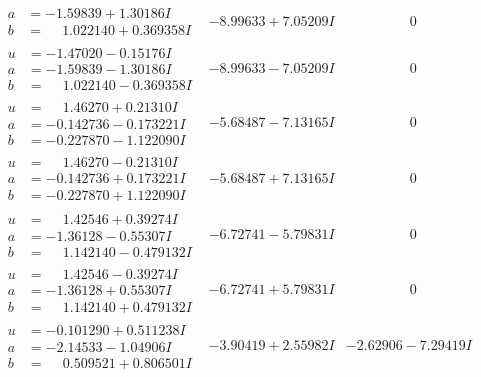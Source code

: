 \documentclass[1p]{elsarticle_modified}
\theoremstyle{definition}
\begin{document}
$$\begin{array}{c|c|c}
\begin{aligned}
a &= -1.59839 + 1.30186 I \\
b &= \phantom{-}1.022140 + 0.369358 I\end{aligned}
 & -8.99633 + 7.05209 I & \phantom{-0.000000 } 0 \\ \hline\begin{aligned}
u &= -1.47020 - 0.15176 I \\
a &= -1.59839 - 1.30186 I \\
b &= \phantom{-}1.022140 - 0.369358 I\end{aligned}
 & -8.99633 - 7.05209 I & \phantom{-0.000000 } 0 \\ \hline\begin{aligned}
u &= \phantom{-}1.46270 + 0.21310 I \\
a &= -0.142736 - 0.173221 I \\
b &= -0.227870 - 1.122090 I\end{aligned}
 & -5.68487 - 7.13165 I & \phantom{-0.000000 } 0 \\ \hline\begin{aligned}
u &= \phantom{-}1.46270 - 0.21310 I \\
a &= -0.142736 + 0.173221 I \\
b &= -0.227870 + 1.122090 I\end{aligned}
 & -5.68487 + 7.13165 I & \phantom{-0.000000 } 0 \\ \hline\begin{aligned}
u &= \phantom{-}1.42546 + 0.39274 I \\
a &= -1.36128 - 0.55307 I \\
b &= \phantom{-}1.142140 - 0.479132 I\end{aligned}
 & -6.72741 - 5.79831 I & \phantom{-0.000000 } 0 \\ \hline\begin{aligned}
u &= \phantom{-}1.42546 - 0.39274 I \\
a &= -1.36128 + 0.55307 I \\
b &= \phantom{-}1.142140 + 0.479132 I\end{aligned}
 & -6.72741 + 5.79831 I & \phantom{-0.000000 } 0 \\ \hline\begin{aligned}
u &= -0.101290 + 0.511238 I \\
a &= -2.14533 - 1.04906 I \\
b &= \phantom{-}0.509521 + 0.806501 I\end{aligned}
 & -3.90419 + 2.55982 I & -2.62906 - 7.29419 I \\ \hline\begin{aligned}

\end{aligned}
\end{array}$$
\end{document}

